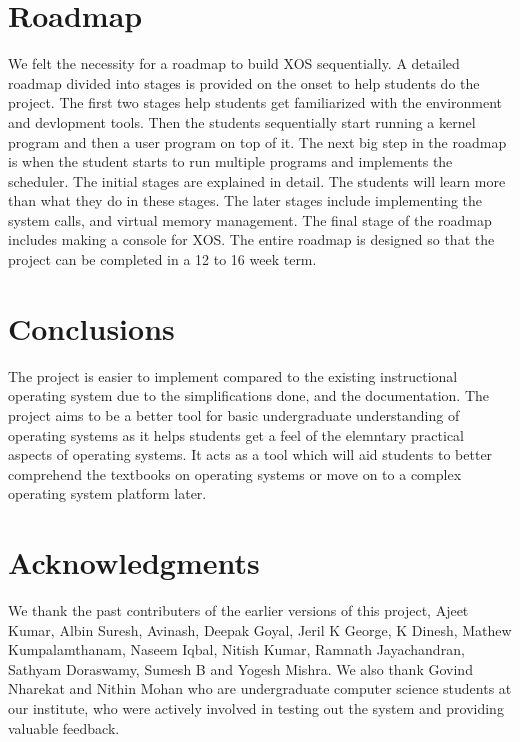 \documentclass{sig-alternate}
\begin{document}
\section{Roadmap}
We felt the necessity for a roadmap to build XOS sequentially. A detailed roadmap divided into stages is provided on the onset to help students do the project. The first two stages help students get familiarized with the environment and devlopment tools. Then the students sequentially start running a kernel program and then a user program on top of it. The next big step in the roadmap is when the student starts to run multiple programs and implements the scheduler. The initial stages are explained in detail. The students will learn more than what they do in these stages. The later stages include implementing the system calls, and virtual memory management. The final stage of the roadmap includes making a console for XOS. The entire roadmap is designed so that the project can be completed in a 12 to 16 week term. \\

\section{Conclusions}
The project is easier to implement compared to the existing instructional operating system due to the simplifications done, and the documentation. The project aims to be a better tool for basic undergraduate understanding of operating systems as it helps students get a feel of the elemntary practical aspects of operating systems. It acts as a tool which will aid students to better comprehend the textbooks on operating systems or move on to a complex operating system platform later.


\section{Acknowledgments}
We thank the past contributers of the earlier versions of this project, Ajeet Kumar, Albin Suresh, Avinash, Deepak Goyal, Jeril K George, K Dinesh, Mathew Kumpalamthanam, Naseem Iqbal, Nitish Kumar, Ramnath Jayachandran, Sathyam Doraswamy, Sumesh B and Yogesh Mishra. We also thank Govind Nharekat and Nithin Mohan who are undergraduate computer science students at our institute, who were actively involved in testing out the system and providing valuable feedback. 


\end{document}
